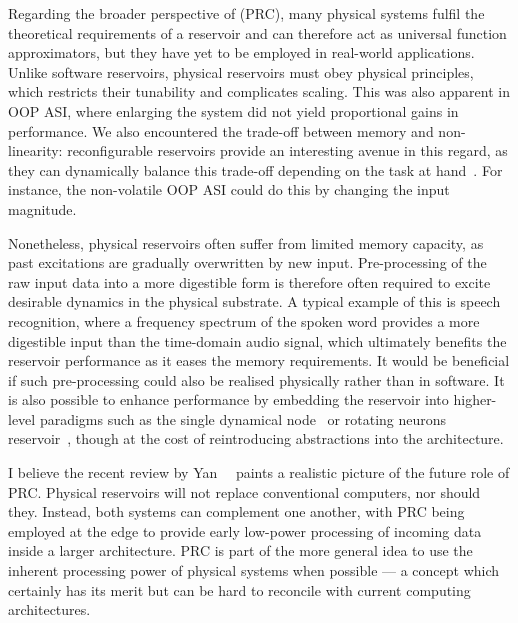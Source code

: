 Regarding the broader perspective of  (PRC), many physical systems fulfil the theoretical requirements of a reservoir and can therefore act as universal function approximators, but they have yet to be employed in real-world applications.
Unlike software reservoirs, physical reservoirs must obey physical principles, which restricts their tunability and complicates scaling.
This was also apparent in OOP ASI, where enlarging the system did not yield proportional gains in performance.
We also encountered the trade-off between memory and non-linearity: reconfigurable reservoirs provide an interesting avenue in this regard, as they can dynamically balance this trade-off depending on the task at hand~\cite{gartside2022reconfigurable}.
For instance, the non-volatile OOP ASI could do this by changing the input magnitude. \par
Nonetheless, physical reservoirs often suffer from limited memory capacity, as past excitations are gradually overwritten by new input.
Pre-processing of the raw input data into a more digestible form is therefore often required to excite desirable dynamics in the physical substrate.
A typical example of this is speech recognition, where a frequency spectrum of the spoken word provides a more digestible input than the time-domain audio signal, which ultimately benefits the reservoir performance as it eases the memory requirements.
It would be beneficial if such pre-processing could also be realised physically rather than in software.
It is also possible to enhance performance by embedding the reservoir into higher-level paradigms such as the single dynamical node~\cite{appeltant2011information} or rotating neurons reservoir~\cite{RotatingNeuronsRC}, though at the cost of reintroducing abstractions into the architecture. \par
I believe the recent review by Yan~\etal{}~\cite{ChallengesFutureRC} paints a realistic picture of the future role of PRC.
Physical reservoirs will not replace conventional computers, nor should they.
Instead, both systems can complement one another, with PRC being employed at the edge to provide early low-power processing of incoming data inside a larger architecture.
PRC is part of the more general idea to use the inherent processing power of physical systems when possible --- a concept which certainly has its merit but can be hard to reconcile with current computing architectures. \\\par

